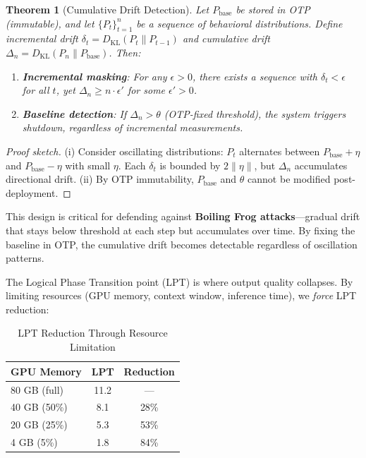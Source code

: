 \documentclass[11pt,a4paper]{article}
\newtheorem{theorem}{Theorem}
\newcommand{\DKL}{D_{\text{KL}}}
\begin{document}
\begin{theorem}[Cumulative Drift Detection]
\label{thm:drift}
Let $P_{\text{base}}$ be stored in OTP (immutable), and let $\{P_t\}_{t=1}^n$ be a sequence of behavioral distributions.
Define incremental drift $\delta_t = \DKL(P_t \| P_{t-1})$ and cumulative drift $\Delta_n = \DKL(P_n \| P_{\text{base}})$.
Then:
\begin{enumerate}
    \item[(i)] \textbf{Incremental masking}: For any $\epsilon > 0$, there exists a sequence with $\delta_t < \epsilon$ for all $t$, yet $\Delta_n \geq n \cdot \epsilon'$ for some $\epsilon' > 0$.
    \item[(ii)] \textbf{Baseline detection}: If $\Delta_n > \theta$ (OTP-fixed threshold), the system triggers shutdown, regardless of incremental measurements.
\end{enumerate}
\end{theorem}

\begin{proof}[Proof sketch]
(i) Consider oscillating distributions: $P_t$ alternates between $P_{\text{base}} + \eta$ and $P_{\text{base}} - \eta$ with small $\eta$.
Each $\delta_t$ is bounded by $2\|\eta\|$, but $\Delta_n$ accumulates directional drift.
(ii) By OTP immutability, $P_{\text{base}}$ and $\theta$ cannot be modified post-deployment.
\end{proof}

This design is critical for defending against \textbf{Boiling Frog attacks}---gradual drift that stays below threshold at each step but accumulates over time.
By fixing the baseline in OTP, the cumulative drift becomes detectable regardless of oscillation patterns.

The Logical Phase Transition point (LPT) is where output quality collapses.
By limiting resources (GPU memory, context window, inference time), we \emph{force} LPT reduction:

\begin{table}[htbp]
\centering
\caption{LPT Reduction Through Resource Limitation}
\label{tab:lpt}
\begin{tabular}{@{}lcc@{}}
\toprule
GPU Memory & LPT & Reduction \\
\midrule
80 GB (full) & 11.2 & --- \\
40 GB (50\%) & 8.1 & 28\% \\
20 GB (25\%) & 5.3 & 53\% \\
4 GB (5\%) & 1.8 & 84\% \\
\bottomrule
\end{tabular}
\end{table}
\end{document}
